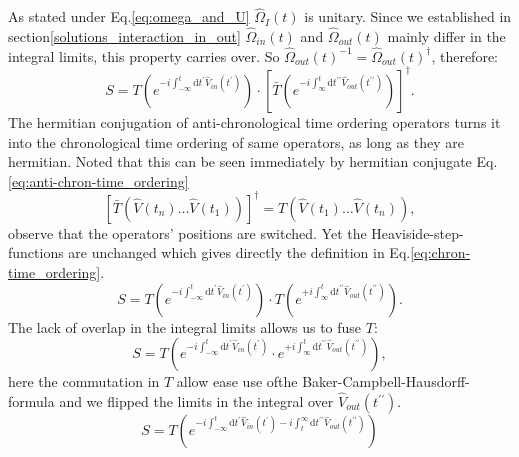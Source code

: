 \documentclass[12pt, titlepage]{article}
\begin{document}
As stated under Eq.\enskip\eqref{eq:omega_and_U} $ \hat{\Omega}_{I}(t) $ is unitary. Since we established in section\ref{solutions_interaction_in_out} $ \hat{\Omega}_{in}(t) $ and $ \hat{\Omega}_{out}(t) $ mainly differ in the integral limits, this property carries over. So $ \hat{\Omega}_{out}(t)^{-1}=\hat{\Omega}_{out}(t)^{\dagger} $, therefore:
\begin{equation}
S=T\left( e^{-i\int_{-\infty}^{t}\mathrm{d}t^{\prime} \hat{V}_{in}(t^{\prime})} \right)
	\cdot
	\left[ 
	\bar{T}\left( e^{-i\int_{\infty}^{t}\mathrm{d}t^{\prime \prime} \hat{V}_{out}(t^{\prime \prime})} \right)
\right]^{\dagger}
	.
\end{equation}
The hermitian conjugation of anti-chronological time ordering operators turns it into the chronological time ordering of same operators, as long as they are hermitian. Noted that this can be seen immediately by hermitian conjugate Eq.\enskip\eqref{eq:anti-chron-time_ordering}
\begin{equation}
\left[
\bar{T}(\hat{V}(t_{n})\ldots\hat{V}(t_{1}))
\right]^{\dagger}
=T(\hat{V}(t_{1})\ldots\hat{V}(t_{n}))
,
\end{equation}
observe that the operators' positions are switched. Yet the Heaviside-step-functions are unchanged which gives directly the definition in Eq.\enskip\eqref{eq:chron-time_ordering}.
\begin{equation}
S=T\left( e^{-i\int_{-\infty}^{t}\mathrm{d}t^{\prime} \hat{V}_{in}(t^{\prime})} \right)
	\cdot
	T\left( e^{+i\int_{\infty}^{t}\mathrm{d}t^{\prime \prime} \hat{V}_{out}(t^{\prime \prime})} \right)
	.
\end{equation}
The lack of overlap in the integral limits allows us to fuse $ T $:
\begin{equation}
S=T\left( e^{-i\int_{-\infty}^{t}\mathrm{d}t^{\prime} \hat{V}_{in}(t^{\prime})}
	\cdot
	 e^{+i\int_{\infty}^{t}\mathrm{d}t^{\prime \prime} \hat{V}_{out}(t^{\prime \prime})} \right),
\end{equation}
here the commutation in $ T $ allow ease use ofthe Baker-Campbell-Hausdorff-formula and we flipped the limits in the integral over $ \hat{V}_{out}(t^{\prime \prime})$.
\begin{equation}
S
=T
\left( 
e^{-i\int_{-\infty}^{t}\mathrm{d}t^{\prime} \hat{V}_{in}(t^{\prime})
-i\int_{t}^{\infty}\mathrm{d}t^{\prime \prime} \hat{V}_{out}(t^{\prime \prime})
}
\right)
\end{equation}
\\
\end{document}
